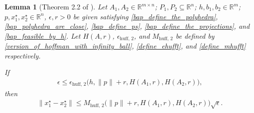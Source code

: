 \documentclass{article}
\newtheorem{lemma}[theorem]{Lemma}
\theoremstyle{case}
\numberwithin{theorem}{subsection}
\newcommand{\ehufft}{{\epsilon_{\textrm{huff, 2}}}}
\newcommand{\mhufft}{{M_{\textrm{huff, 2}}}}
\newcommand{\Rm}{\mathbb R^m}
\newcommand{\Rn}{\mathbb R^n}
\begin{document}
\begin{lemma}[Theorem 2.2 of \cite{continuity_of_metric_projections}]
\label{2_2}
Let 
$A_1, A_2 \in \mathbb R ^ {m \times n}$; 
$P_1, P_2 \subseteq \Rn$; 
$h, b_1, b_2 \in \Rm$; 
$p, x_1^{\star}, x_2^{\star}  \in \Rn$, 
$\epsilon, r > 0$
be given satisfying
\cref{bap_define_the_polyhedra}, \cref{bap_polyhedra_are_close}, \cref{bap_define_ps}, \cref{bap_define_the_projections}, and \cref{bap_feasible_by_h}.
Let 
$H\left(A, r\right)$, $\ehufft$, and $\mhufft$
be defined by 
\cref{version_of_hoffman_with_infinity_ball}, \cref{define_ehufft}, and \cref{define_mhufft}
respectively.

If
\begin{align*}
\epsilon \le \ehufft\big(h, \|p\| + r, H\left(A_1, r\right), H\left(A_2, r\right)\big),
\end{align*}
then
\begin{align*}
\|x_1^{\star} - x_2^{\star}\| 
\le \mhufft \big(\|p\| + r, H\left(A_1, r\right), H\left(A_2, r\right) \big) \sqrt{\epsilon}.
\end{align*}
\end{lemma}
\end{document}
